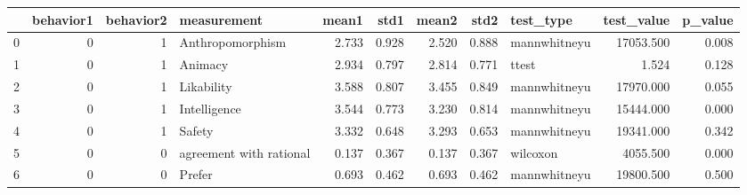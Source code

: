 \begin{tabular}{lrrlrrrrlrr}
\toprule
{} &  behavior1 &  behavior2 &              measurement &  mean1 &   std1 &  mean2 &   std2 &     test\_type &  test\_value &  p\_value \\
\midrule
0 &          0 &          1 &         Anthropomorphism &  2.733 &  0.928 &  2.520 &  0.888 &  mannwhitneyu &   17053.500 &    0.008 \\
1 &          0 &          1 &                  Animacy &  2.934 &  0.797 &  2.814 &  0.771 &         ttest &       1.524 &    0.128 \\
2 &          0 &          1 &               Likability &  3.588 &  0.807 &  3.455 &  0.849 &  mannwhitneyu &   17970.000 &    0.055 \\
3 &          0 &          1 &             Intelligence &  3.544 &  0.773 &  3.230 &  0.814 &  mannwhitneyu &   15444.000 &    0.000 \\
4 &          0 &          1 &                   Safety &  3.332 &  0.648 &  3.293 &  0.653 &  mannwhitneyu &   19341.000 &    0.342 \\
5 &          0 &          0 &  agreement with rational &  0.137 &  0.367 &  0.137 &  0.367 &      wilcoxon &    4055.500 &    0.000 \\
6 &          0 &          0 &                   Prefer &  0.693 &  0.462 &  0.693 &  0.462 &  mannwhitneyu &   19800.500 &    0.500 \\
\bottomrule
\end{tabular}
